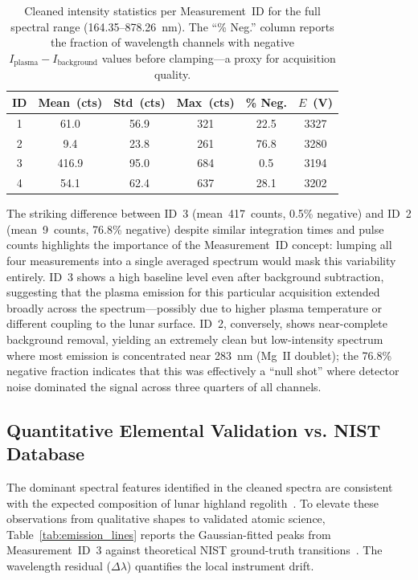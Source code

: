 \documentclass[a4paper,twocolumn,10pt]{article}
\begin{document}
\begin{table}[!t]
\centering
\caption{Cleaned intensity statistics per Measurement~ID for the
  full spectral range (164.35--878.26~nm).  The ``\% Neg.'' column
  reports the fraction of wavelength channels with negative
  $I_{\text{plasma}} - I_{\text{background}}$ values before
  clamping---a proxy for acquisition quality.}
\label{tab:measurement_stats}
{\small
\begin{tabularx}{\textwidth}{@{}cccccc@{}}
\toprule
\textbf{ID} & \textbf{Mean~(cts)} & \textbf{Std~(cts)} &
  \textbf{Max~(cts)} & \textbf{\% Neg.} & \textbf{$E$~(V)} \\
\midrule
1 & 61.0  & 56.9  & 321  & 22.5 & 3327 \\
2 & 9.4   & 23.8  & 261  & 76.8 & 3280 \\
3 & 416.9 & 95.0  & 684  & 0.5  & 3194 \\
4 & 54.1  & 62.4  & 637  & 28.1 & 3202 \\
\bottomrule
\end{tabularx}
}
\end{table}

The striking difference between ID~3 (mean~417~counts, 0.5\% negative)
and ID~2 (mean~9~counts, 76.8\% negative) despite similar integration
times and pulse counts
highlights the importance of the Measurement~ID concept: lumping all
four measurements into a single averaged spectrum would mask this
variability entirely.  ID~3 shows a high baseline level even after
background subtraction, suggesting that the plasma emission for this
particular acquisition extended broadly across the spectrum---possibly
due to higher plasma temperature or different coupling to the lunar
surface.  ID~2, conversely, shows near-complete background removal,
yielding an extremely clean but low-intensity spectrum where most
emission is concentrated near 283~nm (Mg~II doublet); the 76.8\%
negative fraction indicates that this was effectively a ``null shot''
where detector noise dominated the signal across three quarters of
all channels.

\subsection{Quantitative Elemental Validation vs. NIST Database}

The dominant spectral features identified in the cleaned spectra are
consistent with the expected composition of lunar highland
regolith~\cite{Sridhar2025,ISROCh3}.  To elevate these observations from
qualitative shapes to validated atomic science, Table~\ref{tab:emission_lines}
reports the Gaussian-fitted peaks from Measurement~ID~3 against theoretical
NIST ground-truth transitions~\cite{NIST}. The wavelength residual ($\Delta \lambda$)
quantifies the local instrument drift.
\end{document}
